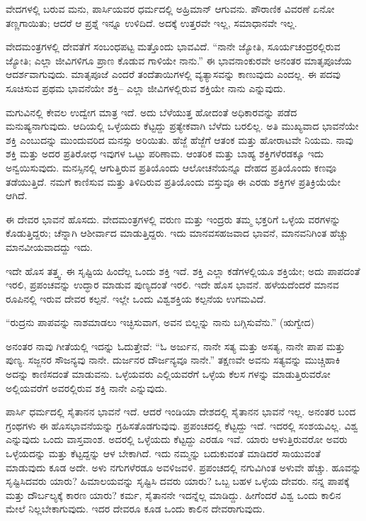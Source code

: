 ವೇದಗಳಲ್ಲಿ ಬರುವ ಮನು, ಪಾರ್ಸಿಯವರ ಧರ್ಮದಲ್ಲಿ ಅಹ್ರಿಮಾನ್​ ಆಗುವನು. ಪೌರಾಣಿಕ ವಿವರಣೆ ಏನೋ ತಣ್ಣಗಾಯಿತು; ಆದರೆ ಆ ಪ್ರಶ್ನೆ ಇನ್ನೂ ಉಳಿದಿದೆ. ಅದಕ್ಕೆ ಉತ್ತರವೇ ಇಲ್ಲ, ಸಮಾಧಾನವೇ ಇಲ್ಲ.

ವೇದಮಂತ್ರಗಳಲ್ಲಿ ದೇವತೆಗೆ ಸಂಬಂಧಪಟ್ಟ ಮತ್ತೊಂದು ಭಾವವಿದೆ. “ನಾನೇ ಜ್ಯೋತಿ, ಸೂರ್ಯಚಂದ್ರರಲ್ಲಿರುವ ಜ್ಯೋತಿ; ಎಲ್ಲಾ ಜೀವಿಗಳಿಗೂ ಪ್ರಾಣ ಕೊಡುವ ಗಾಳಿಯೇ ನಾನು.” ಈ ಭಾವನಾಂಕುರವೇ ಅನಂತರ ಮಾತೃಪೂಜೆಯ ಆದರ್ಶವಾಗುವುದು. ಮಾತೃಪೂಜೆ ಎಂದರೆ ತಂದೆತಾಯಿಗಳಲ್ಲಿ ವ್ಯತ್ಯಾಸವನ್ನು ಕಾಣುವುದು ಎಂದಲ್ಲ. ಈ ಪದವು ಸೂಚಿಸುವ ಪ್ರಥಮ ಭಾವನೆಯೇ ಶಕ್ತಿ– ಎಲ್ಲಾ ಜೀವಿಗಳಲ್ಲಿರುವ ಶಕ್ತಿಯೇ ನಾನು ಎನ್ನುವುದು.

ಮಗುವಿನಲ್ಲಿ ಕೇವಲ ಉದ್ವೇಗ ಮಾತ್ರ ಇದೆ. ಅದು ಬೆಳೆಯುತ್ತ ಹೋದಂತೆ ಅಧಿಕಾರವನ್ನು ಪಡೆದ ಮನುಷ್ಯನಾಗುವುದು. ಆದಿಯಲ್ಲಿ ಒಳ್ಳೆಯದು ಕೆಟ್ಟದ್ದು ಪ್ರತ್ಯೇಕವಾಗಿ ಬೆಳೆದು ಬರಲಿಲ್ಲ. ಅತಿ ಮುಖ್ಯವಾದ ಭಾವನೆಯೇ ಶಕ್ತಿ ಎಂಬುದನ್ನು ಮುಂದುವರಿದ ಮನಸ್ಸು ಅರಿಯಿತು. ಹೆಜ್ಜೆ ಹೆಜ್ಜೆಗೆ ಆತಂಕ ಮತ್ತು ಹೋರಾಟವೇ ನಿಯಮ. ನಾವು ಶಕ್ತಿ ಮತ್ತು ಅದರ ಪ್ರತಿರೋಧ ಇವುಗಳ ಒಟ್ಟು ಪರಿಣಾಮ. ಆಂತರಿಕ ಮತ್ತು ಬಾಹ್ಯ ಶಕ್ತಿಗಳೆರಡಕ್ಕೂ ಇದು ಅನ್ವಯಿಸುವುದು. ಮನಸ್ಸಿನಲ್ಲಿ ಆಗುತ್ತಿರುವ ಪ್ರತಿಯೊಂದು ಆಲೋಚನೆಯನ್ನೂ ದೇಹದ ಪ್ರತಿಯೊಂದು ಕಣವೂ ತಡೆಯುತ್ತಿದೆ. ನಮಗೆ ಕಾಣಿಸುವ ಮತ್ತು ತಿಳಿದಿರುವ ಪ್ರತಿಯೊಂದು ವಸ್ತುವೂ ಈ ಎರಡು ಶಕ್ತಿಗಳ ಪ್ರತಿಕ್ರಿಯೆಯೇ ಆಗಿದೆ.

ಈ ದೇವರ ಭಾವನೆ ಹೊಸದು. ವೇದಮಂತ್ರಗಳಲ್ಲಿ ವರುಣ ಮತ್ತು ಇಂದ್ರರು ತಮ್ಮ ಭಕ್ತರಿಗೆ ಒಳ್ಳೆಯ ವರಗಳನ್ನು ಕೊಡುತ್ತಿದ್ದರು; ಚೆನ್ನಾಗಿ ಆಶೀರ್ವಾದ ಮಾಡುತ್ತಿದ್ದರು. ಇದು ಮಾನವಸಹಜವಾದ ಭಾವನೆ, ಮಾನವನಿಗಿಂತ ಹೆಚ್ಚು ಮಾನವೀಯವಾದದ್ದು ಇದು.

ಇದೇ ಹೊಸ ತತ್ತ್ವ. ಈ ಸೃಷ್ಟಿಯ ಹಿಂದೆಲ್ಲ ಒಂದು ಶಕ್ತಿ ಇದೆ. ಶಕ್ತಿ ಎಲ್ಲಾ ಕಡೆಗಳಲ್ಲಿಯೂ ಶಕ್ತಿಯೇ; ಅದು ಪಾಪದಂತೆ ಇರಲಿ, ಪ್ರಪಂಚವನ್ನು ಉದ್ಧಾರ ಮಾಡುವ ಪುಣ್ಯದಂತೆ ಇರಲಿ. ಇದೇ ಹೊಸ ಭಾವನೆ. ಹಳೆಯದೆಂದರೆ ಮಾನವ ರೂಪಿನಲ್ಲಿ ಇರುವ ದೇವರ ಕಲ್ಪನೆ. ಇಲ್ಲೇ ಒಂದು ವಿಶ್ವಶಕ್ತಿಯ ಕಲ್ಪನೆಯ ಉಗಮವಿದೆ.

“ರುದ್ರನು ಪಾಪವನ್ನು ನಾಶಮಾಡಲು ಇಚ್ಛಿಸುವಾಗ, ಅವನ ಬಿಲ್ಲನ್ನು ನಾನು ಬಗ್ಗಿಸುವೆನು.” (ಋಗ್ವೇದ)

ಅನಂತರ ನಾವು ಗೀತೆಯಲ್ಲಿ ಇದನ್ನು ಓದುತ್ತೇವೆ: “ಓ ಅರ್ಜುನ, ನಾನೇ ಸತ್ಯ ಮತ್ತು ಅಸತ್ಯ, ನಾನೇ ಪಾಪ ಮತ್ತು ಪುಣ್ಯ. ಸಜ್ಜನರ ಸೌಜನ್ಯವು ನಾನೇ. ದುರ್ಜನರ ದೌರ್ಜನ್ಯವೂ ನಾನೇ.” ತಕ್ಷಣವೇ ಅವನು ಸತ್ಯವನ್ನು ಮುಚ್ಚಿಹಾಕಿ ಅದನ್ನು ಕಾಣಿಸದಂತೆ ಮಾಡುವನು. ಒಳ್ಳೆಯವರು ಎಲ್ಲಿಯವರೆಗೆ ಒಳ್ಳೆಯ ಕೆಲಸ ಗಳನ್ನು ಮಾಡುತ್ತಿರುವರೋ ಅಲ್ಲಿಯವರೆಗೆ ಅವರಲ್ಲಿರುವ ಶಕ್ತಿ ನಾನೇ ಎನ್ನುವುದು.

ಪಾರ್ಸಿ ಧರ್ಮದಲ್ಲಿ ಸೈತಾನನ ಭಾವನೆ ಇದೆ. ಆದರೆ ಇಂಡಿಯಾ ದೇಶದಲ್ಲಿ ಸೈತಾನನ ಭಾವನೆ ಇಲ್ಲ. ಅನಂತರ ಬಂದ ಗ್ರಂಥಗಳು ಈ ಹೊಸಭಾವನೆಯನ್ನು ಗ್ರಹಿಸತೊಡಗುವುವು. ಪ್ರಪಂಚದಲ್ಲಿ ಕೆಟ್ಟದ್ದು ಇದೆ. ಇದರಲ್ಲಿ ಸಂಶಯವಿಲ್ಲ. ವಿಶ್ವ ಎನ್ನುವುದು ಒಂದು ವಾಸ್ತವಾಂಶ. ಅದರಲ್ಲಿ ಒಳ್ಳೆಯದು ಕೆಟ್ಟದ್ದು ಎರಡೂ ಇವೆ. ಯಾರು ಆಳುತ್ತಿರುವರೋ ಅವರು ಒಳ್ಳೆಯದನ್ನು ಮತ್ತು ಕೆಟ್ಟದ್ದನ್ನು ಆಳ ಬೇಕಾಗಿದೆ. ಇದು ನಮ್ಮನ್ನು ಬದುಕುವಂತೆ ಮಾಡಿದರೆ ಸಾಯುವಂತೆ ಮಾಡುವುದು ಕೂಡ ಅದೇ. ಅಳು ನಗುಗಳೆರಡೂ ಅವಳಿಜವಳಿ. ಪ್ರಪಂಚದಲ್ಲಿ ನಗುವಿಗಿಂತ ಅಳುವೇ ಹೆಚ್ಚು. ಹೂವನ್ನು ಸೃಷ್ಟಿಸಿದವರು ಯಾರು? ಹಿಮಾಲಯವನ್ನು ಸೃಷ್ಟಿಸಿ ದವರು ಯಾರು? ಒಬ್ಬ ಬಹಳ ಒಳ್ಳೆಯ ದೇವರು. ನನ್ನ ಪಾಪಕ್ಕೆ ಮತ್ತು ದೌರ್ಬಲ್ಯಕ್ಕೆ ಕಾರಣ ಯಾರು? ಕರ್ಮ, ಸೈತಾನನೇ ಇದನ್ನೆಲ್ಲ ಮಾಡಿದ್ದು. ಹೀಗೆಂದರೆ ವಿಶ್ವ ಒಂದು ಕಾಲಿನ ಮೇಲೆ ನಿಲ್ಲಬೇಕಾಗುವುದು. ಇದರ ದೇವರೂ ಕೂಡ ಒಂದು ಕಾಲಿನ ದೇವರಾಗುವುದು.


